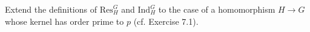 Extend the definitions of $\text{Res}_H^G$ and $\text{Ind}_H^G$ to the case of a homomorphism $H \rightarrow G$ whose kernel has order prime to $p$ (cf. Exercise 7.1).
